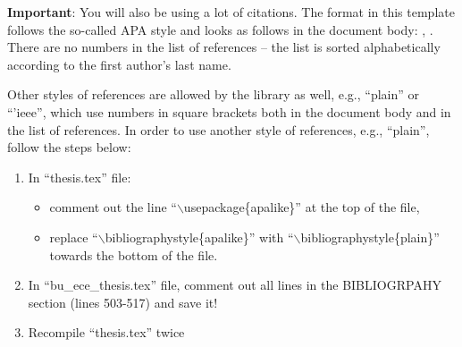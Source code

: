 {\bf Important}: You will also be using a lot of citations. The format in this template follows the so-called APA style and looks as follows in the document body: \cite{lamport1985:latex}, \cite{Debr01}. There are no numbers in the list of references -- the list is sorted alphabetically according to the first author's last name.

Other styles of references are allowed by the library as well, e.g., ``plain'' or ``'ieee'', which use numbers in square brackets both in the document body and in the list of references. In order to use another style of references, e.g., ``plain'', follow the steps below:
%
\begin{enumerate}
  \item In ``thesis.tex'' file:
	\begin{itemize}
	  \item comment out the line ``$\backslash$usepackage\{apalike\}'' at the top of the file,
	  \item replace ``$\backslash$bibliographystyle\{apalike\}'' with ``$\backslash$bibliographystyle\{plain\}'' towards the bottom of the file.
	\end{itemize}
  \item In ``bu\_ece\_thesis.tex'' file, comment out all lines in the BIBLIOGRPAHY section (lines 503-517) and save it!
  \item Recompile ``thesis.tex'' twice
\end{enumerate}

